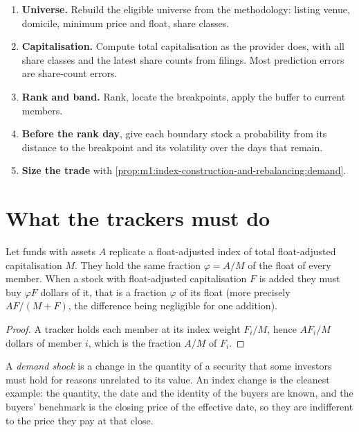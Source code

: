 \begin{method}\label{met:m1:index-construction-and-rebalancing:predict}
\begin{enumerate}
\item \textbf{Universe.} Rebuild the eligible universe from the methodology:
listing venue, domicile, minimum price and float, share classes.
\item \textbf{Capitalisation.} Compute total capitalisation as the provider
does, with all share classes and the latest share counts from filings. Most
prediction errors are share-count errors.
\item \textbf{Rank and band.} Rank, locate the breakpoints, apply the buffer
to current members.
\item \textbf{Before the rank day}, give each boundary stock a probability
from its distance to the breakpoint and its volatility over the days that
remain.
\item \textbf{Size the trade} with \cref{prop:m1:index-construction-and-rebalancing:demand}.
\end{enumerate}
\end{method}

\section{What the trackers must do}

\begin{proposition}\label{prop:m1:index-construction-and-rebalancing:demand}
Let funds with assets $A$ replicate a float-adjusted index of total
float-adjusted capitalisation $M$. They hold the same fraction $\varphi =
A/M$ of the float of every member. When a stock with float-adjusted
capitalisation $F$ is added they must buy $\varphi F$ dollars of it, that is
a fraction $\varphi$ of its float (more precisely $AF/(M+F)$, the difference
being negligible for one addition).
\end{proposition}
\begin{proof}
A tracker holds each member at its index weight $F_i/M$, hence $AF_i/M$
dollars of member $i$, which is the fraction $A/M$ of $F_i$.
\end{proof}

\begin{definition}\label{def:m1:index-construction-and-rebalancing:shock}
A \emph{demand shock} is a change in the quantity of a
security that some investors must hold for reasons unrelated to its value. An
index change is the cleanest example: the quantity, the date and the identity
of the buyers are known, and the buyers' benchmark is the closing price of
the effective date, so they are indifferent to the price they pay at that
close.
\end{definition}


